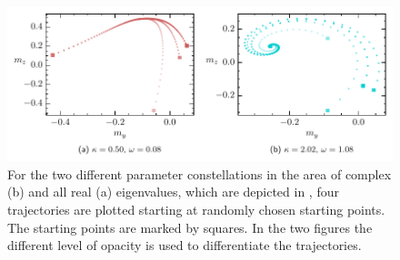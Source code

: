 \begin{figure}[H]
    \centering
    \includegraphics{pictures/example_traj_d0.pdf}
    \caption{For the two different parameter constellations in the area of complex (b) and all real (a) eigenvalues, which are depicted in , four trajectories are plotted starting at randomly chosen starting points. The starting points are marked by squares. In the two figures the different level of opacity is used to differentiate the trajectories.
    }
    \label{fig:expl_traj_d0}
\end{figure}

